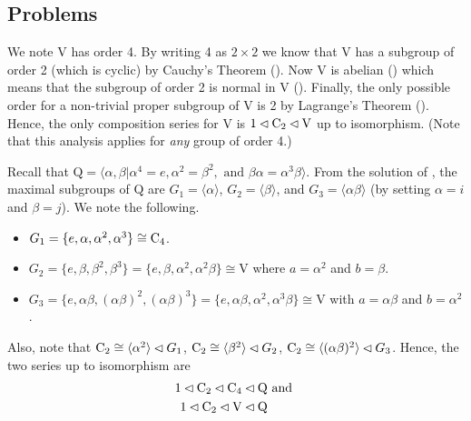 \subsection*{Problems}
\begin{questions}
    \item \begin{partquestions}{\roman*}
        \item We note $\mathrm{V}$ has order 4. By writing 4 as $2 \times 2$ we know that $\mathrm{V}$ has a subgroup of order 2 (which is cyclic) by Cauchy's Theorem (). Now $\mathrm{V}$ is abelian () which means that the subgroup of order 2 is normal in $\mathrm{V}$ (). Finally, the only possible order for a non-trivial proper subgroup of $\mathrm{V}$ is 2 by Lagrange's Theorem (). Hence, the only composition series for $\mathrm{V}$ is $1 \lhd \mathrm{C}_{2} \lhd \mathrm{V}$ up to isomorphism.\newline
        (Note that this analysis applies for \textit{any} group of order 4.)

        \item Recall that $\mathrm{Q} = \langle \alpha, \beta \vert \alpha^4 = e, \alpha^2 = \beta^2, \text{ and } \beta\alpha = \alpha^3\beta \rangle$. From the solution of , the maximal subgroups of $\mathrm{Q}$ are $G_1 = \langle \alpha \rangle$, $G_2 = \langle \beta \rangle$, and $G_3 = \langle \alpha\beta \rangle$ (by setting $\alpha = i$ and $\beta = j$). We note the following.
        \begin{itemize}
            \item $G_1 = \{e, \alpha, \alpha^2, \alpha^3\} \cong \mathrm{C}_{4}$.
            \item $G_2 = \{e, \beta, \beta^2, \beta^3\} = \{e, \beta, \alpha^2, \alpha^2\beta\} \cong \mathrm{V}$ where $a = \alpha^2$ and $b = \beta$.
            \item $G_3 = \{e, \alpha\beta, (\alpha\beta)^2, (\alpha\beta)^3\} = \{e, \alpha\beta, \alpha^2, \alpha^3\beta\} \cong \mathrm{V}$ with $a = \alpha\beta$ and $b = \alpha^2$.
        \end{itemize}
        Also, note that $\mathrm{C}_{2} \cong \langle \alpha^2 \rangle \lhd G_1$, $\mathrm{C}_{2} \cong \langle \beta^2 \rangle \lhd G_2$, $\mathrm{C}_{2} \cong \langle (\alpha\beta)^2 \rangle \lhd G_3$. Hence, the two series up to isomorphism are
        \begin{align*}
            1 \lhd \mathrm{C}_{2} \lhd \mathrm{C}_{4} \lhd \mathrm{Q} & \text{ and }\\
            1 \lhd \mathrm{C}_{2} \lhd \mathrm{V} \lhd \mathrm{Q}
        \end{align*}


\end{partquestions}
\end{questions}
